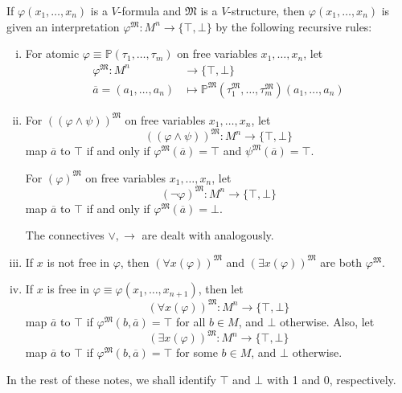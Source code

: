 \documentclass{scrartcl}
\begin{document}
If $\varphi(x_1,\dots,x_n)$ is a $V$-formula and $\mathfrak{M}$ is a $V$-structure, then $\varphi(x_1,\dots,x_n)$ is given an interpretation $\varphi^{\mathfrak{M}}:M^n\to \{\top,\bot\}$ by the following recursive rules:
\begin{enumerate}[i)]

\item For atomic $\varphi\equiv \mathbb{P}(\tau_1,\dots, \tau_m)$ on free variables $x_1,\dots,x_n$, let
\begin{align*}
\varphi^{\mathfrak{M}}\colon M^n&\to \{\top,\bot\}\\
\overline{a}=(a_1,\dots,a_n) &\mapsto \mathbb{P}^{\mathfrak{M}}(\tau_1^{\mathfrak{M}},\dots, \tau_m^{\mathfrak{M}})(a_1,\dots,a_n)
\end{align*}

\item For $((\varphi\wedge\psi))^\mathfrak{M}$ on free variables $x_1,\dots,x_n$, let
\[
((\varphi\wedge\psi))^{\mathfrak{M}} \colon M^n \to \{\top,\bot\}
\]
map $\overline{a}$ to $\top$ if and only if $\varphi^\mathfrak{M}(\overline{a}) = \top$ and $\psi^\mathfrak{M}(\overline{a}) = \top$.

For $(\varphi)^\mathfrak{M}$ on free variables $x_1,\dots,x_n$, let
\[
(\neg\varphi)^{\mathfrak{M}} \colon M^n \to \{\top,\bot\}
\]
map $\overline{a}$ to $\top$ if and only if $\varphi^{\mathfrak{M}}(\overline{a}) = \bot$.

The connectives $\vee,\to$ are dealt with analogously.

\item If $x$ is not free in $\varphi$, then $(\forall x(\varphi))^{\mathfrak{M}}$ and $(\exists x(\varphi))^{\mathfrak{M}}$ are both $\varphi^{\mathfrak{M}}$.

\item If $x$ is free in $\varphi\equiv \varphi(x_1,\dots,x_{n+1})$, then let %
\[
(\forall x(\varphi))^{\mathfrak{M}}\colon M^n\to \{\top,\bot\}
\]
map $\overline{a}$ to $\top$ if $\varphi^{\mathfrak{M}}(b,\overline{a})=\top$ for all $b\in M$, and $\bot$ otherwise. Also, let 
\[
(\exists x(\varphi))^{\mathfrak{M}}\colon M^n\to \{\top,\bot\}
\]
map $\overline{a}$ to $\top$ if $\varphi^{\mathfrak{M}}(b,\overline{a})=\top$ for some $b\in M$, and $\bot$ otherwise.
\end{enumerate}

In the rest of these notes, we shall identify $\top$ and $\bot$ with 1 and 0, respectively.
\end{document}
